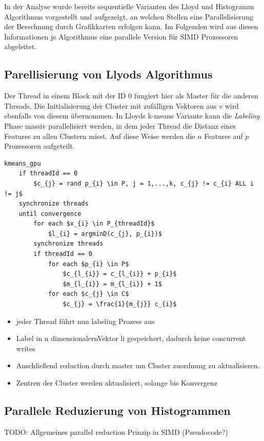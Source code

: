 In der Analyse wurde bereits sequentielle Varianten des Lloyd und Histogramm Algorithmus vorgestellt und aufgezeigt, an welchen Stellen eine Parallelisierung der Berechnung durch Grafikkarten erfolgen kann. Im Folgenden wird aus diesen Informationen je Algorithmus eine parallele Version für SIMD Prozessoren abgeleitet.

\subsection{Parellisierung von Llyods Algorithmus}

Der Thread in einem Block mit der ID 0 fungiert hier als Master für die anderen Threads. Die Initialisierung der Cluster mit zufälligen Vektoren aus $v$ wird ebenfalls von diesem übernommen. In Lloyds k-means Variante kann die \textit{Labeling} Phase massiv parallelisiert werden, in dem jeder Thread die Distanz eines Features zu allen Clustern misst. Auf diese Weise werden die $n$ Features auf $p$ Prozessoren aufgeteilt.

\lstset{language=C}
\begin{lstlisting}[mathescape=true]
kmeans_gpu
	if threadId == 0
		$c_{j} = rand p_{i} \in P, j = 1,...,k, c_{j} != c_{i} ALL i != j$
	synchronize threads
	until convergence
		for each $x_{i} \in P_{threadId}$
			$l_{i} = argminD(c_{j}, p_{i})$
		synchronize threads
		if threadId == 0
			for each $p_{i} \in P$
				$c_{l_{i}} = c_{l_{i}} + p_{i}$
				$m_{l_{i}} = m_{l_{i}} + 1$
			for each $c_{j} \in C$
				$c_{j} = \frac{1}{m_{j}} c_{i}$
\end{lstlisting}



\begin{itemize}
	\item jeder Thread führt nun labeling Prozess aus 
	\item Label in n dimensionalernVektor li gespeichert, dadurch keine concurrent writes
	\item Anschließend reduction durch master um Cluster zuordnung zu aktualisieren.
	\item Zentren der Cluster werden aktualisiert, solange bis Konvergenz
\end{itemize}

\subsection{Parallele Reduzierung von Histogrammen}

TODO: Allgemeines parallel reduction Prinzip in SIMD (Pseudocode?)

